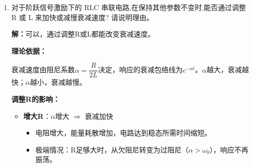 \documentclass[12pt,a4paper]{article}
\begin{document}
\begin{enumerate}
    \textbf{方法一：使用电流探头}
    \begin{itemize}
        \item 采用\textbf{霍尔电流传感器}或\textbf{电流钳}直接测量电流，无需串联采样电阻。
        \item 优点：完全不改变原电路，测量准确。
        \item 缺点：需要专用设备，成本较高。
    \end{itemize}
    
    \textbf{方法二：使用极小阻值的采样电阻}
    \begin{itemize}
        \item 选择$r \ll R$（如$r = 1\Omega$，$R = 100\Omega$），使$r$的影响可忽略。
        \item 计算时将r的影响纳入考虑：$\alpha_{measured} = \dfrac{R + R_L + r}{2L}$，$\alpha_{actual} = \dfrac{R + R_L}{2L}$。
    \end{itemize}
    
    \textbf{方法三：软件补偿}
    \begin{itemize}
        \item 测量完成后，在数据处理时将r的影响计算并扣除。
        \item 修正公式：$\alpha_{corrected} = \alpha_{measured} - \dfrac{r}{2L}$。
    \end{itemize}
    
    \textbf{方法四：差分测量}
    \begin{itemize}
        \item 分别测量有r和无r时的电路响应，通过对比消除r的影响。
    \end{itemize}
    
    \textbf{推荐方案：}实际应用中，结合\textbf{方法二和方法三}，即选用小阻值采样电阻并在计算时进行软件补偿，既经济实用又能保证测量精度。
    
    \item 对于阶跃信号激励下的 RLC 串联电路,在保持其他参数不变时,能否通过调整 R 或 L 来加快或减慢衰减速度? 请说明理由。
    
    \textbf{解：}可以，通过调整R或L都能改变衰减速度。
    
    \textbf{理论依据：}
    
    衰减速度由阻尼系数$\alpha = \dfrac{R}{2L}$决定，响应的衰减包络线为$e^{-\alpha t}$。$\alpha$越大，衰减越快；$\alpha$越小，衰减越慢。
    
    \textbf{调整R的影响：}
    \begin{itemize}
        \item \textbf{增大R}：$\alpha$增大 $\Rightarrow$ 衰减加快
        \begin{itemize}
            \item 电阻增大，能量耗散增加，电路达到稳态所需时间缩短。
            \item 极端情况：R足够大时，从欠阻尼转变为过阻尼（$\alpha > \omega_0$），响应不再振荡。
        \end{itemize}
        

\end{itemize}
\end{enumerate}
\end{document}
